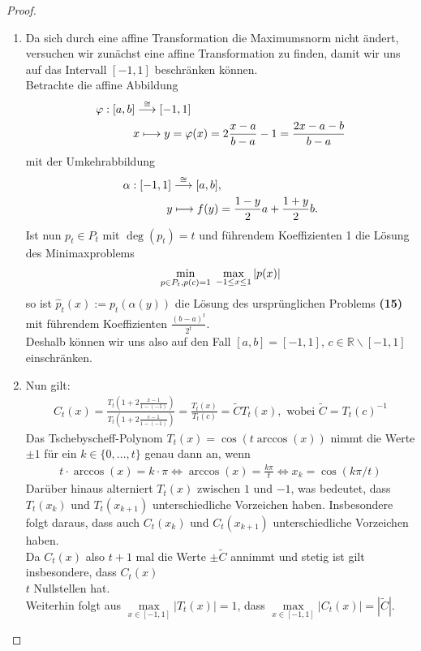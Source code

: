 \documentclass[12pt,a4paper,numbers=endperiod]{scrartcl}
\theoremstyle{definition}
\def\RR{{\mathbb R}}
\begin{document}
\begin{proof}
	$ $
	\begin{enumerate}
		\item 
	Da sich durch eine affine Transformation die Maximumsnorm nicht ändert, versuchen wir zunächst eine affine Transformation zu finden, damit wir uns auf das Intervall $[-1,1]$ beschränken können.\\
	Betrachte die affine Abbildung
	\begin{align*}
	\varphi: [a,b] \overset{\cong}{\longrightarrow} [-1,1] \hspace{48 mm}\\
	x \longmapsto y = \varphi(x) = 2 \frac{x-a}{b-a} -1 = \frac{2x -a -b}{b-a}
	\end{align*}
	mit der Umkehrabbildung
	\begin{align*}
	\alpha: [-1,1] \overset{\cong}{\longrightarrow} [a,b], \hspace{30mm}\\
	y \longmapsto f(y) = \frac{1-y}{2} a + \frac{1+y}{2} b.
	\end{align*}
	Ist nun $p_t \in P_t$ mit $\deg(p_t) = t$ und führendem Koeffizienten 1 die Lösung des 
	Minimaxproblems
	\begin{align*}
	\min\limits_{p \in P_t, p(c) = 1} \hspace{1mm} \max\limits_{-1 \leq x \leq 1} |p(x)|
	\end{align*} 
	so ist $\hat{p}_t(x) := p_t(\alpha(y))$ die Lösung des ursprünglichen Problems \textbf{(15)} mit führendem Koeffizienten $\frac{(b-a)^t}{2^t}$.\\
	Deshalb können wir uns also auf den Fall $[a,b] = [-1,1]$, $c \in \RR \backslash [-1,1]$ einschränken.\\ 
	
	\item 
	Nun gilt:
	\begin{gather}
	C_t(x) = \frac{T_t(1 + 2 \frac{x-1}{1-(-1)})}{T_t(1 + 2\frac{c-1}{1-(-1)})} = \frac{T_t(x)}{T_t(c)} = \tilde{C}T_t(x), \text{ wobei } \tilde{C} = T_t(c)^{-1}
	\end{gather}
	Das Tschebyscheff-Polynom $T_t(x) = \cos(t \arccos(x))$ nimmt die Werte $\pm 1$ für ein $k \in \{0,\ldots,t \}$ genau dann an, wenn
	\begin{align*}
	t \cdot \arccos(x) = k \cdot \pi \Leftrightarrow \arccos(x) = \frac{k\pi}{t} \Leftrightarrow x_k = \cos(k\pi/t)
	\end{align*}
	Darüber hinaus alterniert $T_t(x)$ zwischen $1$ und $-1$, was bedeutet, dass $T_t(x_k)$ und $T_t(x_{k+1})$ unterschiedliche Vorzeichen haben. Insbesondere folgt daraus, dass auch $C_t(x_k)$ und $C_t(x_{k+1})$ unterschiedliche Vorzeichen haben.\\
	Da $C_t(x)$ also $t+1$ mal die Werte $\pm \tilde{C}$ annimmt und stetig ist gilt insbesondere, dass $C_t(x)$\\ $t$ Nullstellen hat.\\
	Weiterhin folgt aus $\max\limits_{x \in [-1,1]} |T_t(x)| = 1$, dass $\max\limits_{x \in [-1,1]} |C_t(x)| = |\tilde{C}|$.\\
	

\end{enumerate}
\end{proof}
\end{document}
